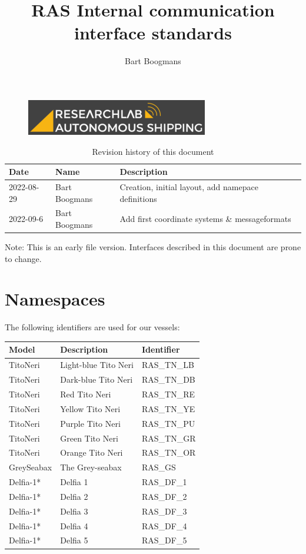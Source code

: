 \documentclass[]{article}
\title{RAS Internal communication interface standards}
\author{Bart Boogmans}
\begin{document}
\maketitle
 
 \begin{figure}[H]
	\centering
	\includegraphics{YW_RAS_logo_GreyBackground.png}
\end{figure}
 
\vfill
\begin{table}[H]
	\centering
	\begin{tabular}{lll}
		Date       & Name          & Description \\ \hline
		2022-08-29 & Bart Boogmans & Creation, initial layout, add namepace definitions  \\
		2022-09-6	& Bart Boogmans	& Add first coordinate systems \& messageformats      
	\end{tabular}
	\caption{Revision history of this document}
\end{table}

Note: This is an early file version. Interfaces described in this document are prone to change. 

\newpage
\section{Namespaces}
The following identifiers are used for our vessels:

\begin{table}[H]
	\centering
	\begin{tabular}{lll}
		Model    & Description          & Identifier  \\ \hline
		TitoNeri & Light-blue Tito Neri & RAS\_TN\_LB \\
		TitoNeri & Dark-blue Tito Neri        & RAS\_TN\_DB \\
		TitoNeri & Red Tito Neri        & RAS\_TN\_RE \\
		TitoNeri & Yellow Tito Neri        & RAS\_TN\_YE \\
		TitoNeri & Purple Tito Neri        & RAS\_TN\_PU \\

		TitoNeri & Green Tito Neri        & RAS\_TN\_GR \\
		TitoNeri & Orange Tito Neri        & RAS\_TN\_OR \\
		GreySeabax & The Grey-seabax        & RAS\_GS \\
		Delfia-1* & Delfia 1       & RAS\_DF\_1 \\
		Delfia-1* & Delfia 2       & RAS\_DF\_2 \\
		Delfia-1* & Delfia 3       & RAS\_DF\_3 \\
		Delfia-1* & Delfia 4       & RAS\_DF\_4 \\
		Delfia-1* & Delfia 5       & RAS\_DF\_5 
		
	\end{tabular}
\end{table}
\end{document}
